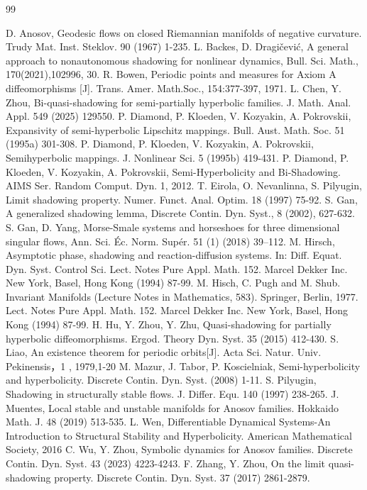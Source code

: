 \documentclass[12pt]{article}
\begin{document}
\newpage
{}
%
\begin{thebibliography}{99} 

D. Anosov, Geodesic flows on closed Riemannian manifolds of negative curvature. Trudy Mat. Inst. Steklov. 90 (1967) 1-235.
L. Backes, D. Dragi\v{c}evi\'{c}, A general approach to nonautonomous shadowing for nonlinear dynamics, Bull. Sci. Math.,  170(2021),102996, 30.
R. Bowen, Periodic points and measures for Axiom A diffeomorphisms [J]. Trans. Amer. 
Math.Soc., 154:377-397, 1971.
L. Chen, Y. Zhou, Bi-quasi-shadowing for semi-partially hyperbolic families. J. Math. Anal. Appl. 549 (2025) 129550.
P. Diamond, P. Kloeden, V. Kozyakin, A. Pokrovskii, Expansivity of semi-hyperbolic Lipschitz mappings. Bull. Aust. Math. Soc. 51 (1995a) 301-308.
P. Diamond, P. Kloeden, V. Kozyakin, A. Pokrovskii, Semihyperbolic mappings. J. Nonlinear Sci. 5 (1995b) 419-431.
P. Diamond, P. Kloeden, V. Kozyakin, A. Pokrovskii, Semi-Hyperbolicity and Bi-Shadowing. AIMS Ser. Random Comput. Dyn. 1, 2012.
T. Eirola, O. Nevanlinna, S. Pilyugin, Limit shadowing property. Numer. Funct. Anal. Optim. 18 (1997) 75-92.
S. Gan, A generalized shadowing lemma, Discrete Contin. Dyn. Syst., 8 (2002), 627-632.
S. Gan, D. Yang, Morse-Smale systems and horseshoes for three dimensional singular flows, Ann. Sci. Éc. Norm.
Supér. 51 (1) (2018) 39–112.
M. Hirsch, Asymptotic phase, shadowing and reaction-diffusion systems. In: Diff. Equat. Dyn. Syst. Control Sci. Lect. Notes Pure Appl. Math. 152. Marcel Dekker Inc. New York, Basel, Hong Kong (1994) 87-99.
M. Hisch, C. Pugh and M. Shub. Invariant Manifolds (Lecture Notes in Mathematics, 583). Springer, Berlin,
1977.
Lect. Notes Pure Appl. Math. 152. Marcel Dekker Inc. New York, Basel, Hong Kong (1994) 87-99.
H. Hu, Y. Zhou, Y. Zhu, Quasi-shadowing for partially hyperbolic diffeomorphisms. Ergod. Theory Dyn. Syst. 35 (2015) 412-430.
S. Liao, An existence theorem for periodic orbits[J]. Acta Sci. Natur. Univ. Pekinensis，1 , 
1979,1-20
M. Mazur, J. Tabor, P. Koscielniak, Semi-hyperbolicity and hyperbolicity. Discrete Contin. Dyn. Syst. (2008) 1-11.
S. Pilyugin, Shadowing in structurally stable flows. J. Differ. Equ. 140 (1997) 238-265.
J. Muentes, Local stable and unstable manifolds for Anosov families. Hokkaido Math. J. 48 (2019) 513-535.
L. Wen, Differentiable Dynamical Systems-An Introduction to Structural Stability and Hyperbolicity. American
Mathematical Society, 2016
  C. Wu, Y. Zhou, Symbolic dynamics for Anosov families. Discrete Contin. Dyn. Syst. 43 (2023) 4223-4243.
 F. Zhang, Y. Zhou, On the limit quasi-shadowing property. Discrete Contin. Dyn. Syst. 37 (2017) 2861-2879.
    
\end{thebibliography}
\end{document}
